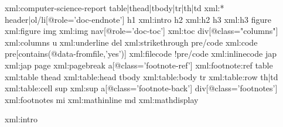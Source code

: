 \startxmlsetups xml:computer-science-report
  \xmlsetsetup{\xmldocument}
    {table|thead|tbody|tr|th|td}
    {xml:*}
  \xmlsetsetup{\xmldocument}
    {header|ol/li[@role='doc-endnote']}
    {}
  \xmlsetsetup{\xmldocument}
    {h1}
    {xml:intro}
  \xmlsetsetup{\xmldocument}
    {h2}
    {xml:h2}
  \xmlsetsetup{\xmldocument}
    {h3}
    {xml:h3}
  \xmlsetsetup{\xmldocument}
    {figure}
    {xml:figure}
  \xmlsetsetup{\xmldocument}
    {img}
    {xml:img}
  \xmlsetsetup{\xmldocument}
    {nav[@role='doc-toc']}
    {xml:toc}
  \xmlsetsetup{\xmldocument}
    {div[@class="columns"]}
    {xml:columns}
  \xmlsetsetup{\xmldocument}
    {u}
    {xml:underline}
  \xmlsetsetup{\xmldocument}
    {del}
    {xml:strikethrough}
  \xmlsetsetup{\xmldocument}
    {pre/code}
    {xml:code}
  \xmlsetsetup{\xmldocument}
    {pre[contains(@data-fromfile,'yes')]}
    {xml:filecode}
  \xmlsetsetup{\xmldocument}
    {!pre/code}
    {xml:inlinecode}
  \xmlsetsetup{\xmldocument}
    {jap}
    {xml:jap}
  \xmlsetsetup{\xmldocument}
    {page}
    {xml:pagebreak}
  \xmlsetsetup{\xmldocument}
    {a[@class='footnote-ref']}
    {xml:footnote:ref}
  \xmlsetsetup{\xmldocument}
    {table}
    {xml:table}
  \xmlsetsetup{\xmldocument}
    {thead}
    {xml:table:head}
  \xmlsetsetup{\xmldocument}
    {tbody}
    {xml:table:body}
  \xmlsetsetup{\xmldocument}
    {tr}
    {xml:table:row}
  \xmlsetsetup{\xmldocument}
    {th|td}
    {xml:table:cell}
  \xmlsetsetup{\xmldocument}
    {sup}
    {xml:sup}
  \xmlsetsetup{\xmldocument}
    {a[@class='footnote-back']}
    {}
  \xmlsetsetup{\xmldocument}
    {div[@class='footnotes']}
    {xml:footnotes}
  \xmlsetsetup{\xmldocument}
    {mi}
    {xml:mathinline}
  \xmlsetsetup{\xmldocument}
    {md}
    {xml:mathdisplay}
\stopxmlsetups


\setuphead[intro][number=no,page=no,incrementnumber=list]

\startxmlsetups xml:intro
    {\page} %
\stopxmlsetups

